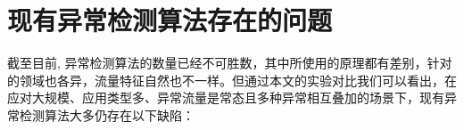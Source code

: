 






\section{现有异常检测算法存在的问题}
截至目前, 异常检测算法的数量已经不可胜数，其中所使用的原理都有差别，针对的领域也各异，流量特征自然也不一样。但通过本文的实验对比我们可以看出，在应对大规模、应用类型多、异常流量是常态且多种异常相互叠加的场景下，现有异常检测算法大多仍存在以下缺陷：

